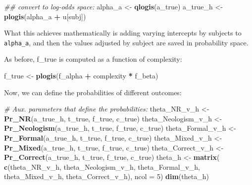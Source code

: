 \documentclass[12pt,]{krantz}
\newenvironment{Shaded}{\begin{snugshade}}{\end{snugshade}}
\newcommand{\CommentTok}[1]{\textcolor[rgb]{0.56,0.35,0.01}{\textit{#1}}}
\newcommand{\DataTypeTok}[1]{\textcolor[rgb]{0.13,0.29,0.53}{#1}}
\newcommand{\DecValTok}[1]{\textcolor[rgb]{0.00,0.00,0.81}{#1}}
\newcommand{\KeywordTok}[1]{\textcolor[rgb]{0.13,0.29,0.53}{\textbf{#1}}}
\newcommand{\NormalTok}[1]{#1}
\newcommand{\OperatorTok}[1]{\textcolor[rgb]{0.81,0.36,0.00}{\textbf{#1}}}
\newcommand{\StringTok}[1]{\textcolor[rgb]{0.31,0.60,0.02}{#1}}
\theoremstyle{definition}
\theoremstyle{definition}
\theoremstyle{definition}
\theoremstyle{remark}
\begin{document}
\begin{Shaded}
\begin{Highlighting}[]
\CommentTok{## convert to log-odds space:}
\NormalTok{alpha_a <-}\StringTok{ }\KeywordTok{qlogis}\NormalTok{(a_true)}
\NormalTok{a_true_h <-}\StringTok{ }\KeywordTok{plogis}\NormalTok{(alpha_a }\OperatorTok{+}\StringTok{ }\NormalTok{u[subj])}
\end{Highlighting}
\end{Shaded}

What this achieves mathematically is adding varying intercepts by subjects to \texttt{alpha\_a}, and then the values adjusted by subject are saved in probability space.

As before, f\_true is computed as a function of complexity:

\begin{Shaded}
\begin{Highlighting}[]
\NormalTok{f_true <-}\StringTok{ }\KeywordTok{plogis}\NormalTok{(f_alpha }\OperatorTok{+}\StringTok{ }\NormalTok{complexity }\OperatorTok{*}\StringTok{ }\NormalTok{f_beta)}
\end{Highlighting}
\end{Shaded}

Now, we can define the probabilities of different outcomes:

\begin{Shaded}
\begin{Highlighting}[]
\CommentTok{# Aux. parameters that define the probabilities:}
\NormalTok{theta_NR_v_h <-}\StringTok{ }\KeywordTok{Pr_NR}\NormalTok{(a_true_h, t_true, f_true, c_true) }
\NormalTok{theta_Neologism_v_h <-}\StringTok{ }\KeywordTok{Pr_Neologism}\NormalTok{(a_true_h, t_true, f_true, c_true)}
\NormalTok{theta_Formal_v_h <-}\StringTok{ }\KeywordTok{Pr_Formal}\NormalTok{(a_true_h, t_true, f_true, c_true)}
\NormalTok{theta_Mixed_v_h <-}\StringTok{ }\KeywordTok{Pr_Mixed}\NormalTok{(a_true_h, t_true, f_true, c_true)}
\NormalTok{theta_Correct_v_h <-}\StringTok{ }\KeywordTok{Pr_Correct}\NormalTok{(a_true_h, t_true, f_true, c_true)}
\NormalTok{theta_h <-}\StringTok{ }\KeywordTok{matrix}\NormalTok{(}
  \KeywordTok{c}\NormalTok{(theta_NR_v_h,}
\NormalTok{    theta_Neologism_v_h,}
\NormalTok{    theta_Formal_v_h,}
\NormalTok{    theta_Mixed_v_h,}
\NormalTok{    theta_Correct_v_h),}
  \DataTypeTok{ncol =} \DecValTok{5}\NormalTok{)}
\KeywordTok{dim}\NormalTok{(theta_h)}
\end{Highlighting}
\end{Shaded}
\end{document}
